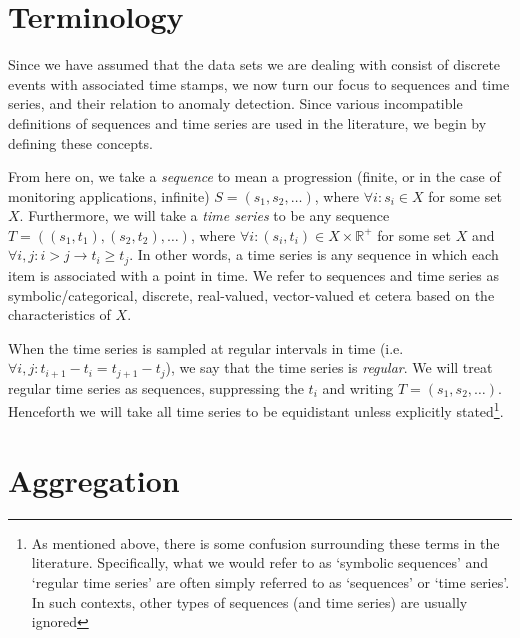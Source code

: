 \section{Terminology}
\label{sect:terminology}

Since we have assumed that the data sets we are dealing with consist of discrete events with associated time stamps, we now turn our focus to sequences and time series, and their relation to anomaly detection. Since various incompatible definitions of sequences and time series are used in the literature, we begin by defining these concepts.

From here on, we take a \emph{sequence} to mean a progression (finite, or in the case of monitoring applications, infinite) $S = (s_1, s_2, \dots)$, where $\forall i: s_i \in X$ for some set $X$. Furthermore, we will take a \emph{time series} to be any sequence $T = ((s_1, t_1), (s_2, t_2), \dots)$, where $\forall i: (s_i, t_i) \in X \times \mathbb{R}^+$ for some set $X$ and $\forall i, j: i > j \rightarrow t_i \geq t_j$. In other words, a time series is any sequence in which each item is associated with a point in time. We refer to sequences and time series as symbolic/categorical, discrete, real-valued, vector-valued et cetera based on the characteristics of $X$.

When the time series is sampled at regular intervals in time (i.e. $\forall i, j: t_{i+1} - t_i = t_{j+1} - t_j$), we say that the time series is \emph{regular}. We will treat regular time series as sequences, suppressing the $t_i$ and writing $T = (s_1, s_2, \dots)$. Henceforth we will take all time series to be equidistant unless explicitly stated\footnote{As mentioned above, there is some confusion surrounding these terms in the literature. Specifically, what we would refer to as `symbolic sequences' and `regular time series' are often simply referred to as `sequences' or `time series'. In such contexts, other types of sequences (and time series) are usually ignored}.

\section{Aggregation}
\label{sect:aggregation}

